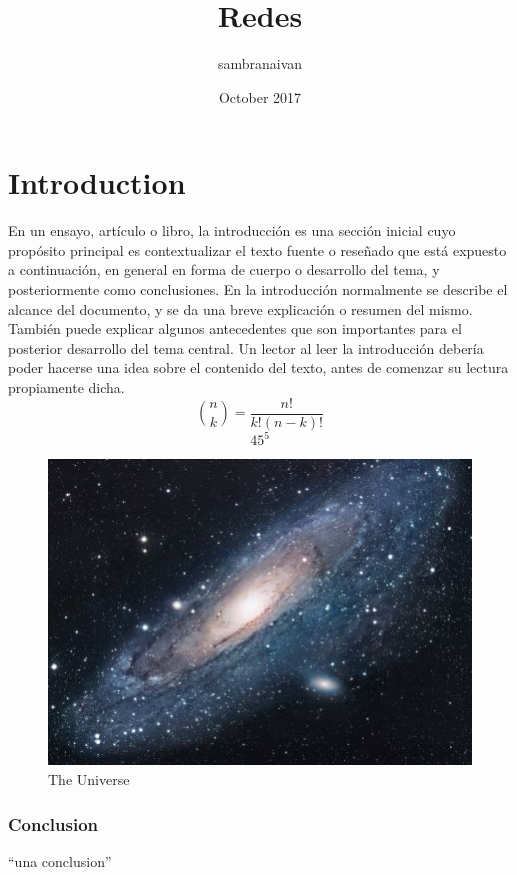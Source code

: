 \documentclass{article}
\title{Redes}
\author{sambranaivan }
\date{October 2017}
\begin{document}
\maketitle

\section{Introduction}
En un ensayo, artículo o libro, la introducción es una sección inicial cuyo propósito principal es contextualizar el texto fuente o reseñado que está expuesto a continuación, en general en forma de cuerpo o desarrollo del tema, y posteriormente como conclusiones.
En la introducción normalmente se describe el alcance del documento, y se da una breve explicación o resumen del mismo. También puede explicar algunos antecedentes que son importantes para el posterior desarrollo del tema central. Un lector al leer la introducción debería poder hacerse una idea sobre el contenido del texto, antes de comenzar su lectura propiamente dicha.
\[
    \binom{n}{k} = \frac{n!}{k!(n-k)!}
\]
\[
	45^{5}
\]
\begin{figure}[h!]
\centering
\includegraphics[scale=1.7]{imagenes/universe.jpg}
\caption{The Universe}
\label{fig:univerise}
\end{figure}

\subsubsection{Conclusion}
``una conclusion'' \citep{adams1995hitchhiker}



\end{document}
